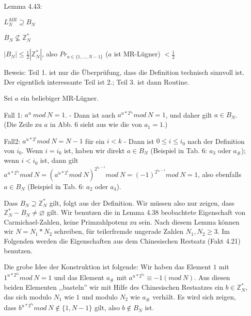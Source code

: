 \documentclass[a4paper]{article}
\begin{document}
\begin{multicols}{3}
        Lemma 4.43:
        \begin{enumerate*}
            \item $L^{MR}_N \supseteq B_N$
            \item $B_N \not\subseteq \mathbb{Z}^*_N$
            \item $|B_N|\leq \frac{1}{2} | \mathbb{Z}^*_N|$, also $Pr_{a\in\{1,...,N-1\}}$ ($a$ ist MR-Lügner) $<\frac{1}{2}$
        \end{enumerate*}

        Beweis: Teil 1. ist nur die Überprüfung, dass die Definition technisch sinnvoll ist. Der eigentlich interessante Teil ist 2.; Teil 3. ist dann Routine.
        \begin{enumerate*}
            \item Sei $a$ ein beliebiger MR-Lügner.
            \begin{itemize*}
                \item Fall 1: $a^u\ mod\ N = 1$. - Dann ist auch $a^{u*2^{i_0}} mod\ N = 1$, und daher gilt $a\in B_N$. (Die Zeile zu $a$ in Abb. 6 sieht aus wie die von $a_1=1$.)
                \item Fall2: $a^{u*2^i} mod\ N=N-1$ für ein $i<k$ - Dann ist $0\leq i\leq i_0$ nach der Definition von $i_0$. Wenn $i=i_0$ ist, haben wir direkt $a\in B_N$ (Beispiel in Tab. 6: $a_3$ oder $a_{\#}$); wenn $i<i_0$ ist, dann gilt $a^{u*2^{i_0}} mod\ N=(a^{u*2^{i}} mod\ N)^{2^{i_{0} -i}} mod\ N= (-1)^{2^{i_{0} -i}} mod\ N= 1$, also ebenfalls $a\in B_N$ (Beispiel in Tab. 6: $a_2$ oder $a_4$).
            \end{itemize*}
            \item Dass $B_N\supseteq \mathbb{Z}^*_N$ gilt, folgt aus der Definition. Wir müssen also nur zeigen, dass $\mathbb{Z}^*_N - B_N\not=\varnothing$ gilt. Wir benutzen die in Lemma 4.38 beobachtete Eigenschaft von Carmichael-Zahlen, keine Primzahlpotenz zu sein. Nach diesem Lemma können wir $N=N_1 *N_2$ schreiben, für teilerfremde ungerade Zahlen $N_1,N_2\geq 3$. Im Folgenden werden die Eigenschaften aus dem Chinesischen Restsatz (Fakt 4.21) benutzen.
            \begin{itemize*}
                \item Die grobe Idee der Konstruktion ist folgende: Wir haben das Element $1$ mit $1^{u*2^{i_0}} mod\ N= 1$ und das Element $a_{\#}$ mit $a^{u*2^{i_0}} \equiv -1 (mod\ N)$. Aus diesen beiden Elementen ,,basteln'' wir mit Hilfe des Chinesischen Restsatzes ein $b\in\mathbb{Z}^*_N$, das sich modulo $N_1$ wie $1$ und modulo $N_2$ wie $a_{\#}$ verhält. Es wird sich zeigen, dass $b^{u*2^{i_0}} mod\ N \not\in\{1 ,N-1\}$ gilt, also $b\not\in B_N$ ist.

\end{itemize*}
\end{enumerate*}
\end{multicols}
\end{document}
